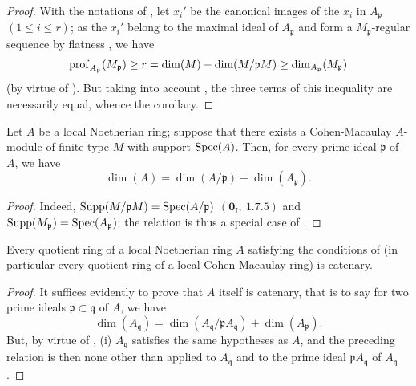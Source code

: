 \begin{proof}
With the notations of , let $x_i'$ be the canonical images of the $x_i$ in $A_\mathfrak{p}$ $(1\leq i\leq r)$; as the $x_i'$ belong to the maximal ideal of $A_\mathfrak{p}$ and form a $M_\mathfrak{p}$-regular sequence by flatness , we have
\[
  \operatorname{prof}_{A_\mathfrak{p}}(M_\mathfrak{p})\geq r=\dim(M)-\dim(M/\mathfrak{p}M)\geq\dim_{A_\mathfrak{p}}(M_\mathfrak{p})
\]
(by virtue of ).
But taking into account , the three terms of this inequality are necessarily equal, whence the corollary.
\end{proof}


\begin{corollary}[16.5.11]
\label{0.16.5.11}
Let $A$ be a local Noetherian ring; suppose that there exists a Cohen-Macaulay $A$-module of finite type $M$ with support $\operatorname{Spec}(A)$.
Then, for every prime ideal $\mathfrak{p}$ of $A$, we have
\begin{equation}
\label{0.16.5.11.1}
\tag{16.5.11.1}
  \dim(A)=\dim(A/\mathfrak{p})+\dim(A_\mathfrak{p}).
\end{equation}
\end{corollary}

\begin{proof}
Indeed, $\operatorname{Supp}(M/\mathfrak{p}M)=\operatorname{Spec}(A/\mathfrak{p})$ $(\mathbf{0}_\mathrm{I},~1.7.5)$ and $\operatorname{Supp}(M_\mathfrak{p})=\operatorname{Spec}(A_\mathfrak{p})$; the relation  is thus a special case of .
\end{proof}

\begin{corollary}[16.5.12]
\label{0.16.5.12}
Every quotient ring of a local Noetherian ring $A$ satisfying the conditions of  (in particular every quotient ring of a local Cohen-Macaulay ring) is catenary.
\end{corollary}

\begin{proof}
It suffices evidently to prove that $A$ itself is catenary, that is to say for two prime ideals $\mathfrak{p}\subset\mathfrak{q}$ of $A$, we have 
\[
  \dim(A_\mathfrak{q})=\dim(A_\mathfrak{q}/\mathfrak{p}A_\mathfrak{q})+\dim(A_\mathfrak{p}).
\]
But, by virtue of , (i) $A_\mathfrak{q}$ satisfies the same hypotheses as $A$, and the preceding relation is then none other than  applied to $A_\mathfrak{q}$ and to the prime ideal $\mathfrak{p}A_\mathfrak{q}$ of $A_\mathfrak{q}$.
\end{proof}


